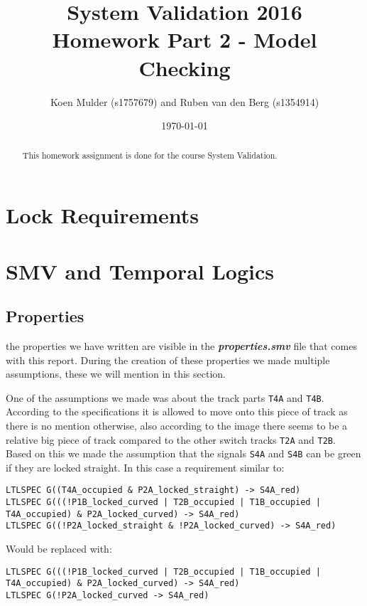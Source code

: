 \documentclass[a4paper]{article}
\title{System Validation 2016 \\ Homework Part 2 - Model Checking}
\author{Koen Mulder (s1757679) and Ruben van den Berg (s1354914)}
\date{\today}
\begin{document}
	\maketitle
	
	\begin{abstract}
		This homework assignment is done for the course System Validation. 
	\end{abstract}
	
	\section{Lock Requirements}

	
	\section{SMV and Temporal Logics}
	
	
	\subsection{Properties}
	the properties we have written are visible in the \textit{\textbf{properties.smv}} file that comes with this report.
	During the creation of these properties we made multiple assumptions, these we will mention in this section.
	
	One of the assumptions we made was about the track parts \texttt{T4A} and \texttt{T4B}. According to the specifications it is allowed to move onto this piece of track as there is no mention otherwise, also according to the image there seems to be a relative big piece of track compared to the other switch tracks \texttt{T2A} and \texttt{T2B}. Based on this we made the assumption that the signals \texttt{S4A} and \texttt{S4B} can be green if they are locked straight. In this case a requirement similar to:
	\begin{lstlisting}
LTLSPEC G((T4A_occupied & P2A_locked_straight) -> S4A_red)
LTLSPEC G(((!P1B_locked_curved | T2B_occupied | T1B_occupied | T4A_occupied) & P2A_locked_curved) -> S4A_red)
LTLSPEC G((!P2A_locked_straight & !P2A_locked_curved) -> S4A_red)
	\end{lstlisting}
	Would be replaced with:
	\begin{lstlisting}
LTLSPEC G(((!P1B_locked_curved | T2B_occupied | T1B_occupied | T4A_occupied) & P2A_locked_curved) -> S4A_red)
LTLSPEC G(!P2A_locked_curved -> S4A_red)
	\end{lstlisting}
	
\end{document}
